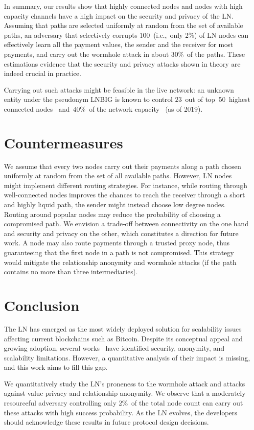 In summary, our results show that highly connected nodes and nodes with high capacity channels have a high impact on the security and privacy of the LN\@.
Assuming that paths are selected uniformly at random from the set of available paths, an adversary that selectively corrupts $100$~(i.e.,~only $2\%$) of LN nodes can effectively learn all the payment values, the sender and the receiver for most payments, and carry out the wormhole attack in about $30\%$~of the paths.
These estimations evidence that the security and privacy attacks shown in theory are indeed crucial in practice.

Carrying out such attacks might be feasible in the live network: an unknown entity under the pseudonym LNBIG is known to control $23$~out of top~$50$~highest connected nodes~\cite{1MLTopConnected} and~$40\%$~of the network capacity~\cite{TheBlockLNBIG} (as of 2019).


\section{Countermeasures}
We assume that every two nodes carry out their payments along a path chosen uniformly at random from the set of all available paths.
However, LN nodes might implement different routing strategies.
For instance, while routing through well-connected nodes improves the chances to reach the receiver through a short and highly liquid path, the sender might instead choose low degree nodes.
Routing around popular nodes may reduce the probability of choosing a compromised path.
We envision a trade-off between connectivity on the one hand and security and privacy on the other, which constitutes a direction for future work.
A node may also route payments through a trusted proxy node, thus guaranteeing that the first node in a path is not compromised.
This strategy would mitigate the relationship anonymity and wormhole attacks (if the path contains no more than three intermediaries).


\section{Conclusion}
\label{sec:conclusions}

The LN has emerged as the most widely deployed solution for scalability issues affecting current blockchains such as Bitcoin.
Despite its conceptual appeal and growing adoption, several works~\cite{Malavolta2017, Malavolta2019} have identified security, anonymity, and scalability limitations.
However, a quantitative analysis of their impact is missing, and this work aims to fill this gap.

We quantitatively study the LN's proneness to the wormhole attack and attacks against value privacy and relationship anonymity.
We observe that a moderately resourceful adversary controlling only $2\%$~of the total node count can carry out these attacks with high success probability.
As the LN evolves, the developers should acknowledge these results in future protocol design decisions.